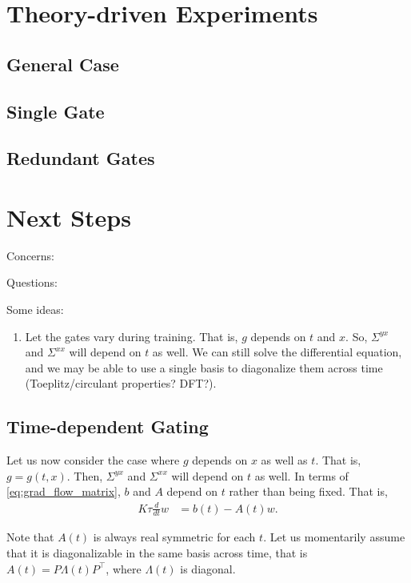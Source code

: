 \documentclass{article}
\begin{document}
\section{Theory-driven Experiments}

\subsection{General Case}

\subsection{Single Gate}

\subsection{Redundant Gates}


\section{Next Steps}
Concerns:

Questions:

Some ideas:
\begin{enumerate}
  \item Let the gates vary during training. 
  That is, $g$ depends on $t$ and $x$.
  So, $\Sigma^{yx}$ and $\Sigma^{xx}$ will depend on $t$ as well.
  We can still solve the differential equation, and we may be able to use a single basis to diagonalize them across time (Toeplitz/circulant properties? DFT?).
\end{enumerate}


\subsection{Time-dependent Gating}
Let us now consider the case where $g$ depends on $x$ as well as $t$.
That is, $g = g(t,x)$.
Then, $\Sigma^{yx}$ and $\Sigma^{xx}$ will depend on $t$ as well.
In terms of \cref{eq:grad_flow_matrix}, $b$ and $A$ depend on $t$ rather than being fixed.
That is,
\begin{align}
  K \tau \frac{d}{dt} w &= b(t) - A(t) w. \label{eq:grad_flow_matrix_time}
\end{align}

Note that $A(t)$ is always real symmetric for each $t$.
Let us momentarily assume that it is diagonalizable in the same basis across time, that is $A(t) = P \Lambda(t) P^\top$, where $\Lambda(t)$ is diagonal.
\end{document}
